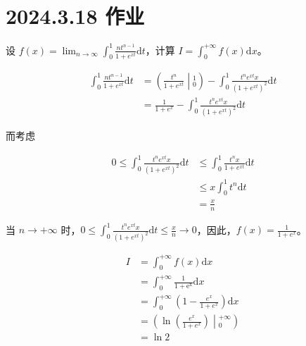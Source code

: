 \ifx\allfiles\undefined

\date{}
\author{尹锦润}

\maketitle
\fi

\section{2024.3.18 作业}
\begin{ques}
	设 $\displaystyle f( x) =\lim _{n\rightarrow \infty }\int _{0}^{1}\frac{nt^{n-1}}{1+e^{xt}}\mathrm{d} t$，计算 $\displaystyle I=\int _{0}^{+\infty } f( x)\mathrm{d} x$。
\end{ques}




\begin{align*}
	\int _{0}^{1}\frac{nt^{n-1}}{1+e^{xt}}\mathrm{d} t & =\left(\frac{t^{n}}{1+e^{xt}}\middle| _{0}^{1}\right) -\int _{0}^{1}\frac{t^{n} e^{xt} x}{\left( 1+e^{xt}\right)^{2}}\mathrm{d} t\\
	& =\frac{1}{1+e^{x}} -\int _{0}^{1}\frac{t^{n} e^{xt} x}{\left( 1+e^{xt}\right)^{2}}\mathrm{d} t
\end{align*}


而考虑


\begin{align*}
	0\leqslant \int _{0}^{1}\frac{t^{n} e^{xt} x}{\left( 1+e^{xt}\right)^{2}}\mathrm{d} t & \leqslant \int _{0}^{1}\frac{t^{n} x}{1+e^{xt}}\mathrm{d} t\\
	& \leqslant x\int _{0}^{1} t^{n}\mathrm{d} t\\
	& =\frac{x}{n}
\end{align*}

当 $\displaystyle n\rightarrow +\infty $ 时，$\displaystyle 0\leqslant \int _{0}^{1}\frac{t^{n} e^{xt} x}{\left( 1+e^{xt}\right)^{2}}\mathrm{d} t\leqslant \frac{x}{n}\rightarrow 0$，因此，$\displaystyle f( x) =\frac{1}{1+e^{x}}$。


\begin{align*}
I & =\int _{0}^{+\infty } f( x)\mathrm{d} x\\
& =\int _{0}^{+\infty }\mathrm{\frac{1}{1+e^{x}} d} x\\
& =\int _{0}^{+\infty }\left( 1-\frac{e^{x}}{1+e^{x}}\right) \mathrm{d} x\\
& =\left(\ln\left(\frac{e^{x}}{1+e^{x}}\right)\middle| _{0}^{+\infty }\right)\\
& =\ln 2
\end{align*}




